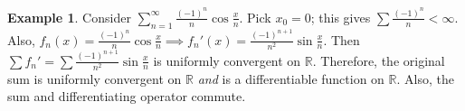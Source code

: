 \documentclass[15pt,a4paper]{book}
\theoremstyle{definition}
\newtheorem{example}[theorem]{Example}
\newcommand{\R}{\mathbb{R}} %
\begin{document}
\begin{example}
    Consider $\sum_{n=1}^{\infty} \frac{(-1)^{n}}{n} \cos \frac{x}{n}$. Pick $x_{0} = 0$; this gives $\sum \frac{(-1)^{n}}{n} < \infty$. Also, $f_{n}(x) = \frac{(-1)^{n}}{n} \cos \frac{x}{n} \implies f_{n}'(x) = \frac{(-1)^{n+1}}{n^{2}} \sin \frac{x}{n}$. Then $\sum f_{n}' = \sum \frac{(-1)^{n+1}}{n^{2}} \sin \frac{x}{n}$ is uniformly convergent on $\R$. Therefore, the original sum is uniformly convergent on $\R$ \textit{and} is a differentiable function on $\R$. Also, the sum and differentiating operator commute.
\end{example}



\end{document}
